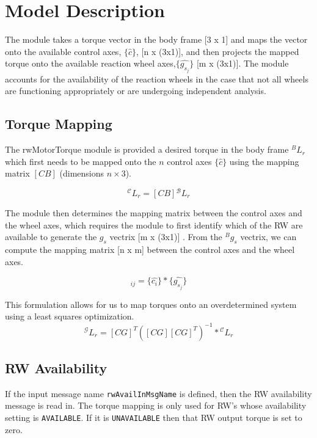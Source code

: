 \section{Model Description}
The module takes a torque vector in the body frame [3 x 1] and maps the vector onto the available control axes, $\lbrace \hat{c} \rbrace$, [n x (3x1)], and then projects the mapped torque onto the available reaction wheel axes,$\lbrace \hat{g_{s_j}} \rbrace$ [m x (3x1)]. The module accounts for the availability of the reaction wheels in the case that not all wheels are functioning appropriately or are undergoing independent analysis. 



\subsection{Torque Mapping}
The rwMotorTorque module is provided a desired torque in the body frame ${}^{B}L_r$ which first needs to be mapped onto the $n$ control axes $\lbrace \hat{c} \rbrace$ using the mapping matrix $[CB]$ (dimensions $n \times 3$). 



\begin{equation}
{}^{\mathcal{C}}L_r = [CB]{}^{\mathcal{B}}L_r
\end{equation}

The module then determines the mapping matrix between the control axes and the wheel axes, which requires the module to first identify which of the RW are available to generate the $g_s$ vectrix [m x (3x1)] . From the ${}^{B}g_s$ vectrix, we can compute the mapping matrix [n x m] between the control axes and the wheel axes.

\begin{equation}
[CG]_{ij} = \lbrace  \hat{c_i} \rbrace*  \lbrace \hat{g_{s_j}} \rbrace
\end{equation}

This formulation allows for us to map torques onto an overdetermined system using a least squares optimization. 
\begin{equation}
 {}^{\mathcal{G}}L_r  = [CG]^T \left([CG][CG]^T\right)^{-1} * {}^{\mathcal{C}}L_r 
\end{equation}


\subsection{RW Availability} 
If the input message name {\tt rwAvailInMsgName} is defined, then the RW availability message is read in. The torque mapping is only used for RW's whose availability setting is {\tt AVAILABLE}.  If it is {\tt UNAVAILABLE} then that RW output torque is set to zero.  

